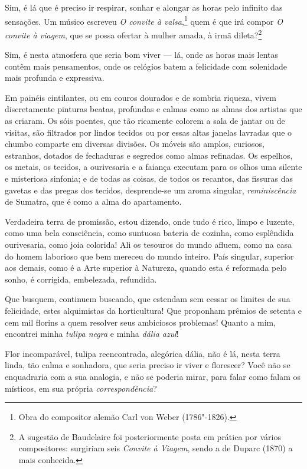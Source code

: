 Sim, é lá que é preciso ir respirar, sonhar e alongar as horas pelo
infinito das sensações. Um músico escreveu \textit{O convite à
valsa},\protect\footnote{ Obra do compositor alemão Carl von Weber (1786"-1826).}
quem é que irá compor \textit{O convite à
viagem}, que se possa ofertar à mulher amada, à irmã
dileta?\protect\footnote{ A sugestão de Baudelaire foi posteriormente posta em prática por
vários compositores: surgiriam seis \textit{Convite à Viagem}, sendo a de Duparc (1870) a
mais conhecida.}

Sim, é nesta atmosfera que seria bom viver --- lá, onde as horas mais
lentas contêm mais pensamentos, onde os relógios batem a felicidade
com solenidade mais profunda e expressiva.

Em painéis cintilantes, ou em couros dourados e de sombria riqueza,
vivem discretamente pinturas beatas, profundas e calmas como as almas
dos artistas que as criaram. Os sóis poentes, que tão ricamente colorem
a sala de jantar ou de visitas, são filtrados por lindos tecidos ou por
essas altas janelas lavradas que o chumbo comparte em diversas
divisões. Os móveis são amplos, curiosos, estranhos, dotados de
fechaduras e segredos como almas refinadas. Os espelhos, os metais, os
tecidos, a ourivesaria e a faiança executam para os olhos uma
silente e misteriosa sinfonia; e de todas as coisas, de todos os recantos, das
fissuras das gavetas e das pregas dos tecidos, desprende-se um aroma
singular, \textit{reminiscência} de Sumatra, que é como a alma do apartamento.

Verdadeira terra de promissão, estou dizendo, onde tudo é rico,
limpo e luzente, como uma bela consciência, como suntuosa bateria
de cozinha, como esplêndida ourivesaria, como joia colorida!
Ali os tesouros do mundo afluem, como na casa do homem laborioso
que bem mereceu do mundo inteiro. País singular, superior aos demais,
como é a Arte superior à Natureza, quando esta é reformada pelo sonho,
é corrigida, embelezada, refundida.

Que busquem, continuem buscando, que estendam sem cessar os limites de
sua felicidade, estes alquimistas da horticultura! Que proponham
prêmios de setenta e cem mil florins a quem resolver seus
ambiciosos problemas! Quanto a mim, encontrei minha \textit{tulipa negra} e
minha \textit{dália azul}!

Flor incomparável, tulipa reencontrada, alegórica dália, não é lá,
nesta terra linda, tão calma e sonhadora, que seria preciso ir viver e
florescer? Você não se enquadraria com a sua analogia, e não se
poderia mirar, para falar como falam os místicos, em sua própria
\textit{correspondência}?

